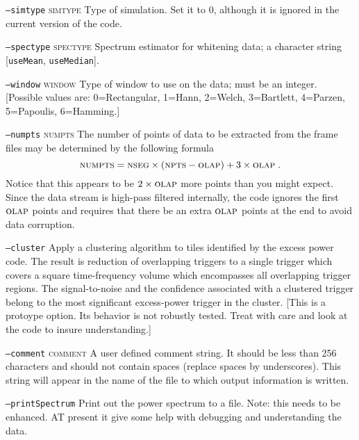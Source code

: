 \begin{entry}
\begin{entry}
\item[\texttt{--simtype} \textsc{simtype}] Type of simulation. Set it to 0,
although it is ignored in the current version of the code.

\item[\texttt{--spectype} \textsc{spectype}] Spectrum estimator for whitening
data;  a character string [\texttt{useMean}, \texttt{useMedian}].

\item[\texttt{--window} \textsc{window}] Type of window to use on the data;
must be an integer.  [Possible values are:  0=Rectangular, 1=Hann,
2=Welch, 3=Bartlett, 4=Parzen, 5=Papoulis, 6=Hamming.]

\item[\texttt{--numpts} \textsc{numpts}] The number of points of data
to be extracted from the frame files may be determined by the
following formula
\[
\mbox{\textsc{numpts}} = \mbox{\textsc{nseg}} \times (
\mbox{\textsc{npts}} - 
\mbox{\textsc{olap}} ) + 3 \times
\mbox{\textsc{olap}} \; .
\]
Notice that this appears to be $2 \times \textsc{olap}$ more points
than you might expect.   Since the data stream is high-pass filtered
internally,   the code ignores the first $\textsc{olap}$ points and
requires that there be an extra $\textsc{olap}$ points at the end to
avoid data corruption.

\item[\texttt{--cluster}] Apply a clustering algorithm to tiles
identified by the excess power code.  The result is reduction of
overlapping triggers to a single trigger which covers a square
time-frequency volume which encompasses all overlapping trigger
regions.   The signal-to-noise and the confidence associated with a
clustered trigger belong to the most significant excess-power trigger
in the cluster.  [This is a protoype option.  Its behavior is not
robustly tested.  Treat with care and look at the code to insure
understanding.]

\item[\texttt{--comment} \textsc{comment}] A user defined comment
string.  It should be less than 256 characters and should not contain
spaces (replace spaces by underscores).  This string will appear in
the name of the file to which output information is written.

\item[\texttt{--printSpectrum}] Print out the power spectrum to a
file.   Note:  this needs to be enhanced.  AT present it give some
help with debugging and understanding the data.


\end{entry}
\end{entry}
